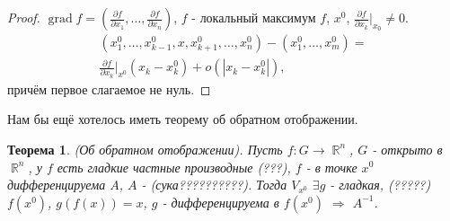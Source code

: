 \documentclass[a4paper,100pt]{article}
\theoremstyle{indented}
\newtheorem{theorem}{Теорема}
\theoremstyle{definition}
\theoremstyle{remark}
\DeclareMathOperator{\RR}{\mathbb{R}}
\DeclareMathOperator{\grad}{grad}
\begin{document}
\begin{proof}
    $\grad f = (\frac{\partial f}{\partial x_1} ,\ldots, \frac{\partial f}{\partial x_n})$, $f$ - локальный максимум $f$, $x^0$, $\frac{\partial f}{\partial x_k}\bigg|_{x_0}\neq 0$. 
    \begin{equation*}
        \begin{split}
            (x_1^0, \ldots, x_{k-1}^0, x, x_{k+1}^0, \ldots, x_n^0)- (x_1^0,\ldots, x_m^0)= \\
            \frac{\partial f}{\partial x_k}\bigg|_{x^0}(x_k-x_k^0)+o(|x_k-x_k^0|),
        \end{split}
    \end{equation*}
    причём первое слагаемое не нуль.
\end{proof} 
 
Нам бы ещё хотелось иметь теорему об обратном отображении. \\

\begin{theorem}
    (Об обратном отображении). Пусть $f: G\rightarrow \RR^n$, $G$ - открыто в $\RR^n$, у $f$ есть гладкие частные производные (???), $f$ - в точке $x^0$ дифференцируема $A$, $A$ - (сука??????????). Тогда $V_{x^0}$ $\exists g $ - гладкая, (?????) $f(x^0)$, $g(f(x))=x$, $g$ - дифференцируема в $f(x^0)$ $\Rightarrow$ $A^{-1}$. 
\end{theorem}
\end{document}
